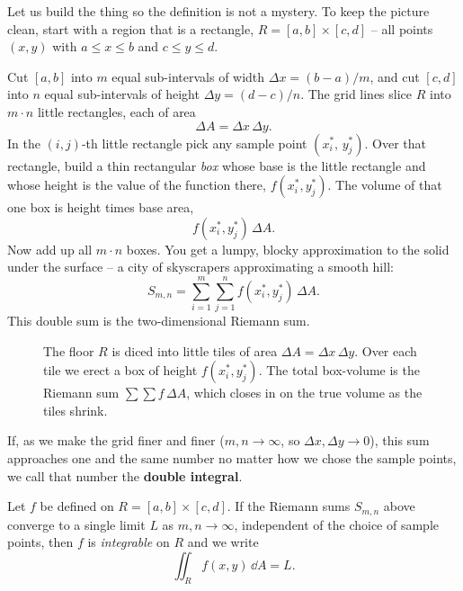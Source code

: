 Let us build the thing so the definition is not a mystery. To keep
the picture clean, start with a region that is a rectangle,
$R=[a,b]\times[c,d]$ -- all points $(x,y)$ with $a\le x\le b$ and $c\le y\le d$.

Cut $[a,b]$ into $m$ equal sub-intervals of width $\Delta x=(b-a)/m$, and cut
$[c,d]$ into $n$ equal sub-intervals of height $\Delta y=(d-c)/n$. The grid lines
slice $R$ into $m\cdot n$ little rectangles, each of area
\[
  \Delta A=\Delta x\,\Delta y .
\]
In the $(i,j)$-th little rectangle pick any sample point
$(x_i^\ast,\,y_j^\ast)$. Over that rectangle, build a thin rectangular
\emph{box} whose base is the little rectangle and whose height is the value of
the function there, $f(x_i^\ast,y_j^\ast)$. The volume of that one box is
height times base area,
\[
  f(x_i^\ast,y_j^\ast)\,\Delta A .
\]
Now add up all $m\cdot n$ boxes. You get a lumpy, blocky approximation to the
solid under the surface -- a city of skyscrapers approximating a smooth hill:
\[
  S_{m,n}=\sum_{i=1}^{m}\sum_{j=1}^{n} f(x_i^\ast,y_j^\ast)\,\Delta A .
\]
This double sum is the two-dimensional Riemann sum.

\begin{figure}[H]
\centering
{}
\caption{The floor $R$ is diced into little tiles of area
$\Delta A=\Delta x\,\Delta y$. Over each tile we erect a box of height
$f(x_i^\ast,y_j^\ast)$. The total box-volume is the Riemann sum
$\sum\sum f\,\Delta A$, which closes in on the true volume as the tiles shrink.}
\label{ch34:fig-grid}
\end{figure}

If, as we make the grid finer and finer ($m,n\to\infty$, so
$\Delta x,\Delta y\to 0$), this sum approaches one and the same number no matter
how we chose the sample points, we call that number the \textbf{double integral}.

\begin{definition}
\label{ch34:def-double}
Let $f$ be defined on $R=[a,b]\times[c,d]$. If the Riemann sums $S_{m,n}$ above
converge to a single limit $L$ as $m,n\to\infty$, independent of the choice of
sample points, then $f$ is \emph{integrable} on $R$ and we write
\[
  \iint_R f(x,y)\,\dd A=L .
\]
\end{definition}

